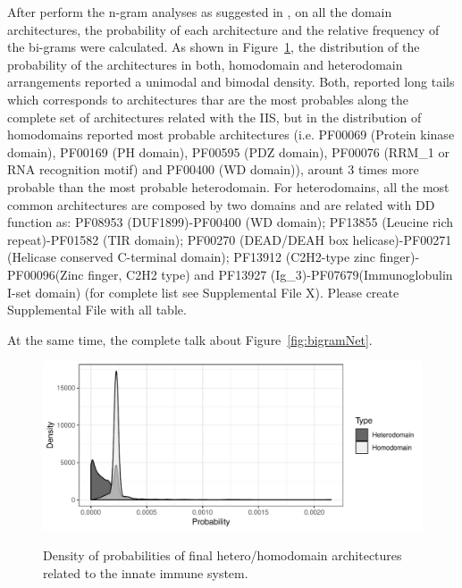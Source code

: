 \documentclass[11pt]{article}
\newcommand{\TODO}[1]{\begingroup\color{red}#1\endgroup}
\begin{document}
After perform the n-gram analyses as suggested in \cite{Yu:2019}, on
all the domain architectures, the probability of each architecture and the 
relative frequency of the bi-grams were calculated. As shown in Figure~\ref{fig:probArch}, 
the distribution of the probability of the architectures in both, homodomain and heterodomain
arrangements reported a unimodal and bimodal density. Both, reported long tails which 
corresponds to architectures thar are the most probables along the complete set of 
architectures related with the IIS, but in the distribution of homodomains reported
most probable architectures (i.e. PF00069 (Protein kinase domain), PF00169 (PH domain), 
PF00595 (PDZ domain), PF00076 (RRM\_1 or RNA recognition motif) and PF00400 (WD domain)), 
arount 3 times more probable than the most probable heterodomain. For heterodomains, all the
most common architectures are composed by two domains and are related with DD function as:
PF08953 (DUF1899)-PF00400 (WD domain); PF13855 (Leucine rich repeat)-PF01582 (TIR domain); 
PF00270 (DEAD/DEAH box helicase)-PF00271 (Helicase conserved C-terminal domain); 
PF13912 (C2H2-type zinc finger)-PF00096(Zinc finger, C2H2 type) and 
PF13927 (Ig\_3)-PF07679(Immunoglobulin I-set domain) 
(for complete list see Supplemental File X). 
\TODO{Please create Supplemental File with all table}.


At the same time, the complete \TODO{talk about Figure~\ref{fig:bigramNet}}. 


\begin{figure}[ht!]
  \centering
  \includegraphics[scale=0.7]{figures/distr_bigrams_complete} \\
  \caption{Density of probabilities of final hetero/homodomain architectures related to the 
  innate immune system.}\label{fig:probArch}
\end{figure}
\end{document}
